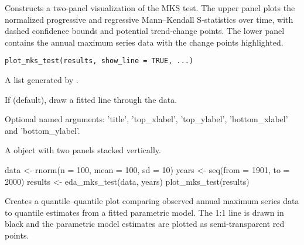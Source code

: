 \documentclass[a4paper]{book}
\begin{document}
%
\begin{Description}
Constructs a two‐panel visualization of the MKS test. The upper panel plots the
normalized progressive and regressive Mann–Kendall S‐statistics over time, with
dashed confidence bounds and potential trend‐change points. The lower panel
contains the annual maximum series data with the change points highlighted.
\end{Description}
%
\begin{Usage}
\begin{verbatim}
plot_mks_test(results, show_line = TRUE, ...)
\end{verbatim}
\end{Usage}
%
\begin{Arguments}
\begin{ldescription}
\item[\code{results}] A list generated by .

\item[\code{show\_line}] If  (default), draw a fitted line through the data.

\item[\code{...}] Optional named arguments: 'title', 'top\_xlabel', 'top\_ylabel',
'bottom\_xlabel' and 'bottom\_ylabel'.
\end{ldescription}
\end{Arguments}
%
\begin{Value}
A  object with two  panels stacked vertically.
\end{Value}
%
\begin{SeeAlso}
\end{SeeAlso}
%
\begin{Examples}
\begin{ExampleCode}
data <- rnorm(n = 100, mean = 100, sd = 10)
years <- seq(from = 1901, to = 2000)
results <- eda_mks_test(data, years)
plot_mks_test(results)

\end{ExampleCode}
\end{Examples}
%
\begin{Description}
Creates a quantile–quantile plot comparing observed annual maximum series
data to quantile estimates from a fitted parametric model. The 1:1 line is drawn in
black and the parametric model estimates are plotted as semi‐transparent red points.
\end{Description}
\end{document}
